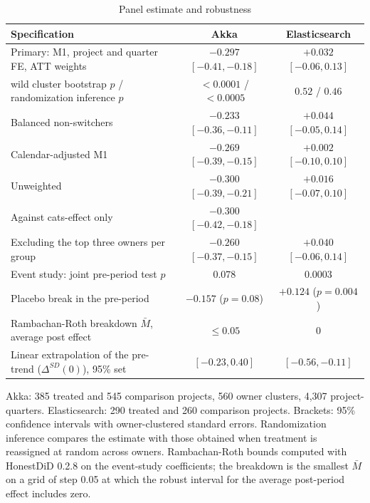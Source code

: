\documentclass[11pt]{article}
\begin{document}
\begin{table}[t]
\centering
\begin{threeparttable}
\caption{Panel estimate and robustness}\label{tab:panel}
\small
\begin{tabular}{lcc}
\toprule
Specification & Akka & Elasticsearch \\
\midrule
Primary: M1, project and quarter FE, ATT weights & $-0.297$ $[-0.41,-0.18]$ & $+0.032$ $[-0.06,0.13]$ \\
\quad wild cluster bootstrap $p$ / randomization inference $p$ & $<0.0001$ / $<0.0005$ & $0.52$ / $0.46$ \\
Balanced non-switchers & $-0.233$ $[-0.36,-0.11]$ & $+0.044$ $[-0.05,0.14]$ \\
Calendar-adjusted M1 & $-0.269$ $[-0.39,-0.15]$ & $+0.002$ $[-0.10,0.10]$ \\
Unweighted & $-0.300$ $[-0.39,-0.21]$ & $+0.016$ $[-0.07,0.10]$ \\
Against cats-effect only & $-0.300$ $[-0.42,-0.18]$ & \\
Excluding the top three owners per group & $-0.260$ $[-0.37,-0.15]$ & $+0.040$ $[-0.06,0.14]$ \\
\midrule
Event study: joint pre-period test $p$ & 0.078 & 0.0003 \\
Placebo break in the pre-period & $-0.157$ ($p=0.08$) & $+0.124$ ($p=0.004$) \\
Rambachan-Roth breakdown $\bar M$, average post effect & $\le 0.05$ & 0 \\
Linear extrapolation of the pre-trend ($\Delta^{SD}(0)$), 95\% set & $[-0.23,0.40]$ & $[-0.56,-0.11]$ \\
\bottomrule
\end{tabular}
\begin{tablenotes}\footnotesize
\item Akka: 385 treated and 545 comparison projects, 560 owner clusters, 4,307 project-quarters. Elasticsearch: 290 treated and 260 comparison projects. Brackets: 95\% confidence intervals with owner-clustered standard errors. Randomization inference compares the estimate with those obtained when treatment is reassigned at random across owners. Rambachan-Roth bounds computed with HonestDiD 0.2.8 on the event-study coefficients; the breakdown is the smallest $\bar M$ on a grid of step 0.05 at which the robust interval for the average post-period effect includes zero.
\end{tablenotes}
\end{threeparttable}
\end{table}
\end{document}
